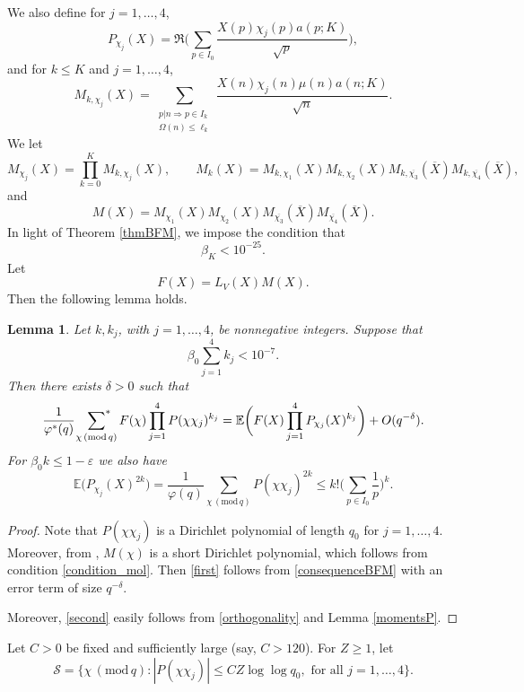 \documentclass[12pt, reqno]{amsart}
\renewcommand{\pmod}[1]{\,(\mathrm{mod}\,#1)}
\newcommand{\E}{\mathbb{E}}
\newcommand{\acom}[1]{{\color{blue}{Alexandra: #1}} }
\newcommand{\hcom}[1]{{\color{red}{Hung: #1}} }
\newtheorem{lemma}[theorem]{Lemma}
\numberwithin{equation}{section}
\numberwithin{theorem}{section}
\numberwithin{equation}{section}
\def\sumstar{\sideset{}{^*}\sum}
\begin{document}
We also define for $j =1,\ldots, 4$,
$$P_{\chi_j}(X) =\Re\bigg(\sum_{p \in I_0} \frac{X(p) \chi_j(p) a(p;K)}{\sqrt{p}}\bigg) ,$$
and for $k \leq K$ and $j =1,\ldots,4$,
$$M_{k,\chi_j} (X)=\sum_{\substack{ p |n \Rightarrow p \in I_k \\ \Omega(n) \leq \ell_k}} \frac{ X(n) \chi_j(n) \mu(n) a(n;K) }{\sqrt{n}}.  $$
We let 
$$M_{\chi_j}(X) = \prod_{k=0}^K M_{k,\chi_j}(X), \qquad  M_k(X) = M_{k,\chi_1}(X) M_{k,\chi_2}(X) M_{k,\overline{\chi_3}}(\overline{X})M_{k,\overline{\chi_4}}(\overline{X}),$$
and $$M(X) = M_{\chi_1}(X) M_{\chi_2}(X) M_{\overline{\chi_3}}(\overline{X})M_{\overline{\chi_4}}(\overline{X}).$$
In light of Theorem \ref{thmBFM}, we impose the condition that %
\begin{equation} 
\label{condition_mol}
\beta_K<10^{-25}.
\end{equation}
   Let 
    $$F(X) = L_V(X) M(X).$$ 
Then the following lemma holds.
\begin{lemma}
\label{lem_expectation}
Let $k,k_j$, with $j=1,\ldots,4$, be nonnegative integers. Suppose that $$\beta_0 \sum_{j=1}^4 k_j < 10^{-7}.$$ Then there exists $\delta>0$ such that
\begin{equation}  \label{first} \frac{1}{\varphi^{*}(q)}\ \sumstar_{\chi \pmod q} F(\chi) \prod_{j=1}^4 P(\chi \chi_j)^{k_j}= \E \bigg( F(X) \prod_{j=1}^4 P_{\chi_j}(X)^{k_j}\bigg) + O ( q^{-\delta}).\end{equation}
  For $\beta_0k \leq 1-\varepsilon$ %
  we also have
  \begin{equation}\label{second} \E \Big(  P_{\chi_j}(X)^{2k}\Big) =\frac{1}{\varphi(q)} \sum_{\chi \pmod q} P(\chi \chi_j)^{2k}\leq k! \Big(\sum_{p \in I_0} \frac{1}{p} \Big)^k.
  \end{equation}
\end{lemma}
\begin{proof}
Note that $P(\chi \chi_j)$ is a Dirichlet polynomial of length $q_0$ for $j=1,\ldots,4$. Moreover, from \cite{BFM}, $M(\chi)$ is a short Dirichlet polynomial, which follows from condition \eqref{condition_mol}. Then \eqref{first} follows from \eqref{consequenceBFM} with an error term of size $q^{-\delta}$. 

Moreover, \eqref{second} easily follows from \eqref{orthogonality} and Lemma \ref{momentsP}.
\end{proof}

Let $C>0$ be fixed and sufficiently large (say, $C>120$). For $Z \geq 1$, let  
    $$ \mathcal{S} = \Big\{  \chi \pmod q: |P(\chi \chi_j)| \leq CZ \log \log q_0, \text{ for all } j=1,\ldots, 4\Big\}.$$
\end{document}
